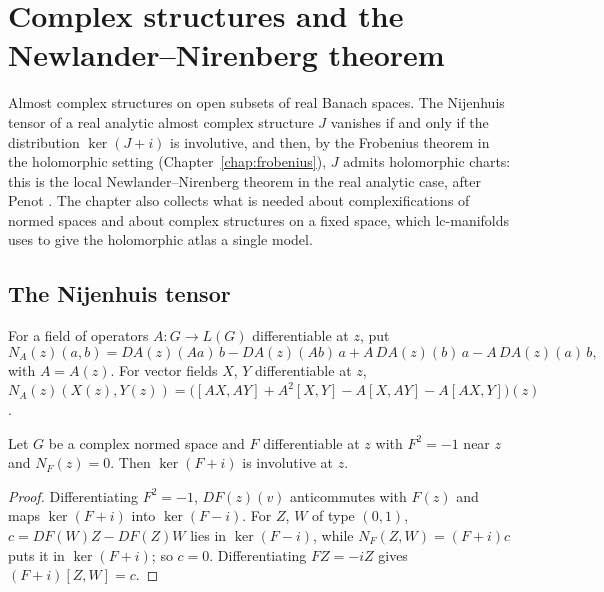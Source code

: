 \chapter{Complex structures and the Newlander--Nirenberg theorem}
\label{chap:complex}

Almost complex structures on open subsets of real Banach spaces. The Nijenhuis tensor of a real
analytic almost complex structure $J$ vanishes if and only if the distribution $\ker(J + i)$ is
involutive, and then, by the Frobenius theorem in the holomorphic setting
(Chapter~\ref{chap:frobenius}), $J$ admits holomorphic charts: this is the local
Newlander--Nirenberg theorem in the real analytic case, after Penot \cite{Pen70}. The chapter
also collects what is needed about complexifications of normed spaces and about complex
structures on a fixed space, which lc-manifolds uses to give the holomorphic atlas a single
model.

\section{The Nijenhuis tensor}

\begin{definition}
  \label{def:nijenhuis}
  \leanok
  For a field of operators $A \colon G \to L(G)$ differentiable at $z$, put
  \[ N_A(z)(a, b) = DA(z)(A a)\,b - DA(z)(A b)\,a + A\,DA(z)(b)\,a - A\,DA(z)(a)\,b, \]
  with $A = A(z)$. For vector fields $X$, $Y$ differentiable at $z$,
  $N_A(z)(X(z), Y(z)) = \bigl([AX, AY] + A^2[X, Y] - A[X, AY] - A[AX, Y]\bigr)(z)$.
\end{definition}

\begin{theorem}
  \label{thm:nijenhuis-involutive}
  \leanok
  Let $G$ be a complex normed space and $F$ differentiable at $z$ with $F^2 = -1$ near $z$ and
  $N_F(z) = 0$. Then $\ker(F + i)$ is involutive at $z$.
\end{theorem}

\begin{proof}
  \leanok
  Differentiating $F^2 = -1$, $DF(z)(v)$ anticommutes with $F(z)$ and maps $\ker(F + i)$ into
  $\ker(F - i)$. For $Z$, $W$ of type $(0, 1)$, $c = DF(W)Z - DF(Z)W$ lies in $\ker(F - i)$, while
  $N_F(Z, W) = (F + i)c$ puts it in $\ker(F + i)$; so $c = 0$. Differentiating $FZ = -iZ$ gives
  $(F + i)[Z, W] = c$.
\end{proof}

